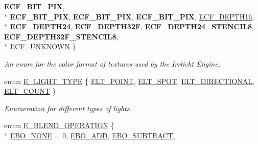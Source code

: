 \begin{DoxyCompactItemize}
{\bfseries E\+C\+F\+\_\+B\+I\+T\+\_\+\+P\+IX}, 
\\*
{\bfseries E\+C\+F\+\_\+B\+I\+T\+\_\+\+P\+IX}, 
{\bfseries E\+C\+F\+\_\+B\+I\+T\+\_\+\+P\+IX}, 
{\bfseries E\+C\+F\+\_\+B\+I\+T\+\_\+\+P\+IX}, 
\hyperlink{namespaceirr_1_1video_a1d5e487888c32b1674a8f75116d829eda2a9f922d0a9c0ad889d29077caa7f0ff}{E\+C\+F\+\_\+\+D\+E\+P\+T\+H16}, 
\\*
{\bfseries E\+C\+F\+\_\+\+D\+E\+P\+T\+H24}, 
{\bfseries E\+C\+F\+\_\+\+D\+E\+P\+T\+H32F}, 
{\bfseries E\+C\+F\+\_\+\+D\+E\+P\+T\+H24\+\_\+\+S\+T\+E\+N\+C\+I\+L8}, 
{\bfseries E\+C\+F\+\_\+\+D\+E\+P\+T\+H32\+F\+\_\+\+S\+T\+E\+N\+C\+I\+L8}, 
\\*
\hyperlink{namespaceirr_1_1video_a1d5e487888c32b1674a8f75116d829eda209608685f06c86c6ae489896a246e77}{E\+C\+F\+\_\+\+U\+N\+K\+N\+O\+WN}
 \}\begin{DoxyCompactList}\small\item\em An enum for the color format of textures used by the Irrlicht Engine. \end{DoxyCompactList}
\item 
enum \hyperlink{namespaceirr_1_1video_aaf0e02f6f83cc35cf9e764bf18400d39}{E\+\_\+\+L\+I\+G\+H\+T\+\_\+\+T\+Y\+PE} \{ \hyperlink{namespaceirr_1_1video_aaf0e02f6f83cc35cf9e764bf18400d39a21113dc8282eeb64fa1d7ba0ec9ee26d}{E\+L\+T\+\_\+\+P\+O\+I\+NT}, 
\hyperlink{namespaceirr_1_1video_aaf0e02f6f83cc35cf9e764bf18400d39a613d955141b78edba7a1e2688b11448a}{E\+L\+T\+\_\+\+S\+P\+OT}, 
\hyperlink{namespaceirr_1_1video_aaf0e02f6f83cc35cf9e764bf18400d39a46a64f42740c097ee15d5c3a87961788}{E\+L\+T\+\_\+\+D\+I\+R\+E\+C\+T\+I\+O\+N\+AL}, 
\hyperlink{namespaceirr_1_1video_aaf0e02f6f83cc35cf9e764bf18400d39aa5fe0f7e9cf66fabb752c9b344c8b276}{E\+L\+T\+\_\+\+C\+O\+U\+NT}
 \}\begin{DoxyCompactList}\small\item\em Enumeration for different types of lights. \end{DoxyCompactList}
\item 
enum \hyperlink{namespaceirr_1_1video_a6d78c1faed23a03e8ef7b7b623bbaf2f}{E\+\_\+\+B\+L\+E\+N\+D\+\_\+\+O\+P\+E\+R\+A\+T\+I\+ON} \{ \\*
\hyperlink{namespaceirr_1_1video_a6d78c1faed23a03e8ef7b7b623bbaf2fa0eae3da7a67fbce9190da69e23e1adce}{E\+B\+O\+\_\+\+N\+O\+NE} = 0, 
\hyperlink{namespaceirr_1_1video_a6d78c1faed23a03e8ef7b7b623bbaf2fac1bcb9f240765e34102c22b6bab0ffea}{E\+B\+O\+\_\+\+A\+DD}, 
\hyperlink{namespaceirr_1_1video_a6d78c1faed23a03e8ef7b7b623bbaf2fa90e4c0c0d003e1da0c27106835ca2f9f}{E\+B\+O\+\_\+\+S\+U\+B\+T\+R\+A\+CT}, 

\end{DoxyCompactItemize}
